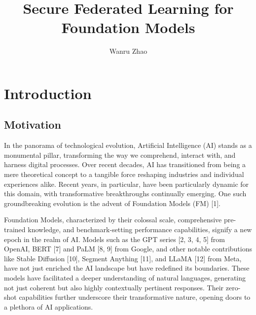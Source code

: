 \documentclass[withindex,glossary,firstyr]{cam-thesis}
\title{Secure Federated Learning for Foundation Models}
\author{Wanru Zhao}
\begin{document}

\frontmatter{}



\chapter{Introduction}



\section{Motivation}

In the panorama of technological evolution, Artificial Intelligence (AI) stands as a monumental pillar, transforming the way we comprehend, interact with, and harness digital processes. Over recent decades, AI has transitioned from being a mere theoretical concept to a tangible force reshaping industries and individual experiences alike. Recent years, in particular, have been particularly dynamic for this domain, with transformative breakthroughs continually emerging. One such groundbreaking evolution is the advent of Foundation Models (FM) [1].

Foundation Models, characterized by their colossal scale, comprehensive pre-trained knowledge, and benchmark-setting performance capabilities, signify a new epoch in the realm of AI. Models such as the GPT series [2, 3, 4, 5] from OpenAI, BERT [7] and PaLM [8, 9] from Google, and other notable contributions like Stable Diffusion [10], Segment Anything [11], and LLaMA [12] from Meta, have not just enriched the AI landscape but have redefined its boundaries. These models have facilitated a deeper understanding of natural languages, generating not just coherent but also highly contextually pertinent responses. Their zero-shot capabilities further underscore their transformative nature, opening doors to a plethora of AI applications.
\end{document}
